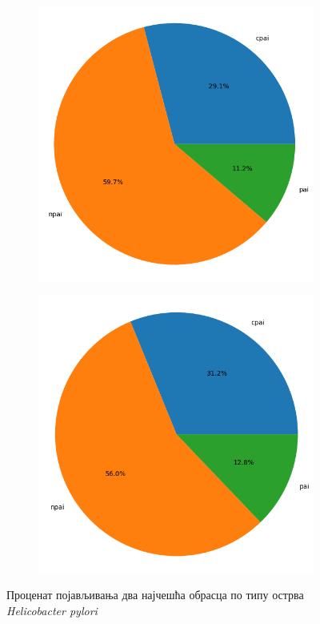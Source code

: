 \documentclass[12pt]{article}
\begin{document}
\begin{figure}[htbp]
    \centering
    \begin{subfigure}{0.48\linewidth}
        \centering
        \includegraphics[width=\linewidth]{images/top_1_by_islands_h_pylori.png}
    \end{subfigure}

    \begin{subfigure}{0.48\linewidth}
        \centering
        \includegraphics[width=\linewidth]{images/top_2_by_islands_h_pylori.png}
    \end{subfigure}
    \caption{Проценат појављивања два најчешћа обрасца по типу острва \textit{Helicobacter pylori}}
\end{figure}
\end{document}
